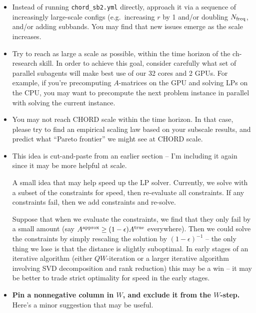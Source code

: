 \documentclass{article}
\numberwithin{equation}{section}   %
\begin{document}
\begin{itemize}

\item Instead of running \verb|chord_sb2.yml| directly, approach it via a sequence of
 increasingly large-scale configs (e.g.\ increasing $r$ by 1 and/or doubling $N_{\rm freq}$,
 and/or adding subbands. You may find that new issues emerge as the scale increases.

\item Try to reach as large a scale as possible, within the time horizon of the ch-research
 skill. In order to achieve this goal, consider carefully what set of parallel subagents will
 make best use of our 32 cores and 2 GPUs. For example, if you're precomputing $A$-matrices
 on the GPU and solving LPs on the CPU, you may want to precompute the next problem instance
 in parallel with solving the current instance.

\item You may not reach CHORD scale within the time horizon. In that case, please try to
 find an empirical scaling law based on your subscale results, and predict what ``Pareto
 frontier'' we might see at CHORD scale.

\item This idea is cut-and-paste from an earlier section -- I'm including it again since
 it may be more helpful at scale.

 A small idea that may help speed up the LP solver.
 Currently, we solve with a subset of the constraints for speed, then re-evaluate
 all constraints. If any constraints fail, then we add constraints and re-solve.

 Suppose that when we evaluate the constraints, we find that they only fail by
 a small amount (say $A^{\rm approx} \ge (1-\epsilon) A^{\rm true}$ everywhere).
 Then we could solve the constraints by simply rescaling the solution by $(1-\epsilon)^{-1}$ --
 the only thing we lose is that the distance is slightly suboptimal.
 In early stages of an iterative algorithm (either $QW$-iteration or a larger iterative
 algorithm involving SVD decomposition and rank reduction) this may be a win -- it may
 be better to trade strict optimality for speed in the early stages.

\item {\bf Pin a nonnegative column in $W$, and exclude it from the $W$-step.}
 Here's a minor suggestion that may be useful.


\end{itemize}
\end{document}
